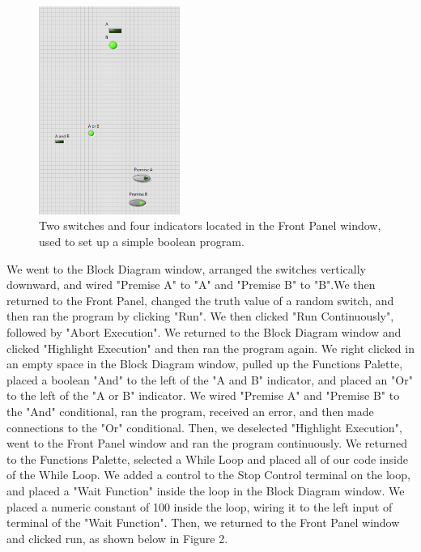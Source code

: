\documentclass[twoside,10pt]{article}
\begin{document}
\begin{multicols}{2}
		\setlength{\textfloatsep}{10pt plus 1.0pt minus 2.0pt}
			\begin{figure}[H]
			\centering
			\includegraphics[width=46mm]{boolean front panel group 4 1.png}
			\caption{Two switches and four indicators located in the Front Panel window, used to set up a simple boolean program. }
		\end{figure}
		
		
		We went to the Block Diagram window, arranged the switches vertically downward, and wired "Premise A" to "A" and "Premise B" to "B".We then returned to the Front Panel, changed the truth value of a random switch, and then ran the program by clicking "Run". We then clicked "Run Continuously", followed by "Abort Execution". We returned to the Block Diagram window and clicked "Highlight Execution" and then ran the program again. We right clicked in an empty space in the Block Diagram window, pulled up the Functions Palette, placed a boolean "And" to the left of the "A and B" indicator, and placed an "Or" to the left of the "A or B" indicator. We wired "Premise A" and "Premise B" to the "And" conditional, ran the program, received an error, and then made connections to the "Or" conditional. Then, we deselected "Highlight Execution", went to the Front Panel window and ran the program continuously. We returned to the Functions Palette, selected a While Loop and placed all of our code inside of the While Loop. We added a control to the Stop Control terminal on the loop, and placed a "Wait Function" inside the loop in the Block Diagram window. We placed a numeric constant of 100 inside the loop, wiring it to the left input of terminal of the "Wait Function". Then, we returned to the Front Panel window and clicked run, as shown below in Figure 2.
		
		\vspace{-10pt}
		

\end{multicols}
\end{document}

